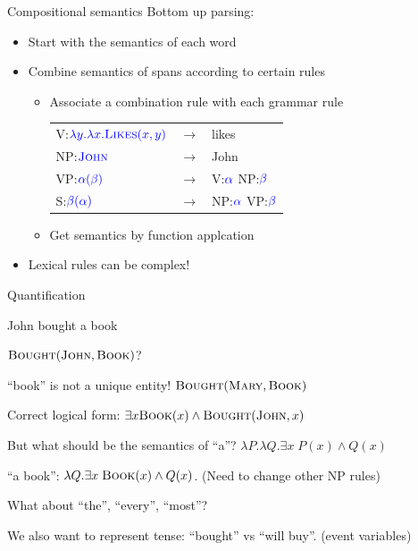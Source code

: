 \documentclass[usenames,dvipsnames,notes,11pt,aspectratio=169]{beamer}
\begin{document}
\begin{frame}
    {Compositional semantics}
    Bottom up parsing:\\
    \begin{itemize}
        \item Start with the semantics of each word
        \item Combine semantics of spans according to certain rules 
            \begin{itemize}
                \item Associate a combination rule with each grammar rule
                    \begin{table}
                        \begin{tabular}{lll}
                            V:${\color{blue}\lambda y.\lambda x.\textsc{Likes}(x,y)}$ & $\rightarrow$ & likes\\
                            NP:${\color{blue}\textsc{John}}$ &$\rightarrow$& John\\ 
                            VP:${\color{blue}\alpha(\beta)}$ &$\rightarrow$& V:${\color{blue}\alpha}$ NP:${\color{blue}\beta}$\\
                            S:${\color{blue}\beta(\alpha)}$ &$\rightarrow$& NP:${\color{blue}\alpha}$ VP:${\color{blue}\beta}$
                        \end{tabular}
                    \end{table}
                \item Get semantics by function applcation
            \end{itemize}
        \item Lexical rules can be complex!
    \end{itemize}
\end{frame}

\begin{frame}
    {Quantification}
    \vspace{2em}
    \begin{center}
        John bought a book
    \end{center}
    \vspace{-1em}
    $\textsc{Bought}(\textsc{John}, \textsc{Book})$?

    ``book'' is not a unique entity! $\textsc{Bought}(\textsc{Mary}, \textsc{Book})$

    Correct logical form: $\exists x \textsc{Book}(x) \land \textsc{Bought}(\textsc{John}, x)$

    But what should be the semantics of ``a''? $\lambda P.\lambda Q. \exists x\; P(x) \land Q(x)$

    ``a book'': $\lambda Q. \exists x\; \textsc{Book}(x) \land Q(x)$. (Need to change other NP rules)

    What about ``the'', ``every'', ``most''? 

    We also want to represent tense: ``bought'' vs ``will buy''. (event variables)
\end{frame}
\end{document}
